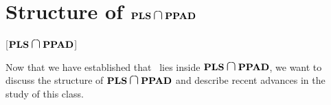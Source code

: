 \section{Structure of \texorpdfstring{$\PLS \medcap \PPAD$}{\PLS\ and \PPAD}}[\texorpdfstring{$\PLS \medcap \PPAD$}{\PLS\ and \PPAD}]

Now that we have established that \Tarski\ lies inside $\PLS \medcap \PPAD$, we want to discuss the structure of $\PLS \medcap \PPAD$ and describe recent
advances in the study of this class.
